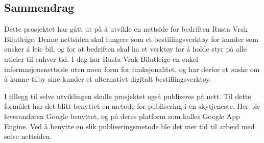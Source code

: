 \documentclass[11pt, oneside]{Thesis} %
\begin{document}
\begin{adjustwidth*}{2cm}{2cm}
\let\clearpage\relax
\chapter{Sammendrag}
Dette prosjektet har gått ut på å utvikle en nettside for bedriften Rusta Vrak Bilutleige. Denne nettsiden skal fungere som et bestillingsverktøy for kunder som ønsker å leie bil, og for at bedriften skal ha et verktøy for å holde styr på alle utleier til enhver tid. I dag har Rusta Vrak Bilutleige en enkel informasjonsnettside uten noen form for funksjonalitet, og har derfor et ønske om å kunne tilby sine kunder et alternativt digitalt bestillingsverktøy.
 
I tillegg til selve utviklingen skulle prosjektet også publiseres på nett. Til dette formålet har det blitt benyttet en metode for publisering i en skytjeneste. Her ble leverandøren Google  benyttet, og på deres platform som kalles Google App Engine. Ved å benytte en slik publiseringsmetode ble det mer tid til arbeid med selve nettsiden.


\end{adjustwidth*}




\newpage

\pagestyle{fancy} %

\tableofcontents %

\listoffigures %




\mainmatter %
\end{document}
